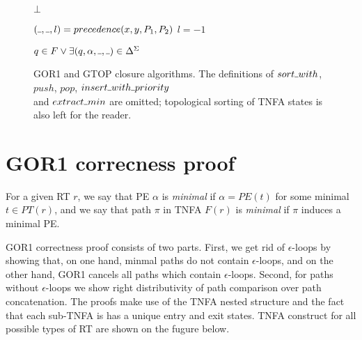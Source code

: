 \documentclass[AMA,STIX1COL]{WileyNJD-v2}
\newcommand{\Xund}{\rule{.4em}{.4pt}}
\begin{document}
\begin{figure*}
\begin{multicols}{2}
\begin{algorithm}[H]
{        \Return $\bot$
    }
    \end{algorithm}


    \begin{algorithm}[H] \DontPrintSemicolon {} 
     {
        $(\Xund, \Xund, l) = precedence (x, y, P_1, P_2)$ \;
        \Return $l = -1$ %
    }
    \end{algorithm}

    \begin{algorithm}[H] \DontPrintSemicolon {} 
     {
        \Return $q \in F \vee \exists (q, \alpha, \Xund, \Xund) \in \Delta^\Sigma$ \;
    }
    \end{algorithm}
\end{multicols}
\vspace{-3em}
\begin{center}
\caption{GOR1 and GTOP closure algorithms.
The definitions of $sort \Xund with$, $push$, $pop$, $insert \Xund with \Xund priority$ \\
and $extract \Xund min$ are omitted;
topological sorting of TNFA states is also left for the reader.}
\end{center}
\end{figure*}


\clearpage
\pagebreak

\section{GOR1 correcness proof}

For a given RT $r$,
we say that PE $\alpha$ is \emph{minimal} if $\alpha = PE(t)$ for some minimal $t \in PT(r)$,
and we say that path $\pi$ in TNFA $F(r)$ is \emph{minimal} if $\pi$ induces a minimal PE.

GOR1 correctness proof consists of two parts.
First, we get rid of $\epsilon$-loops by showing that,
on one hand, minmal paths do not contain $\epsilon$-loops,
and on the other hand, GOR1 cancels all paths which contain $\epsilon$-loops.
Second, for paths without $\epsilon$-loops we show right distributivity of path comparison over path concatenation.
The proofs make use of the TNFA nested structure
and the fact that each sub-TNFA is has a unique entry and exit states.
TNFA construct for all possible types of RT are shown on the fugure below.
\end{document}

